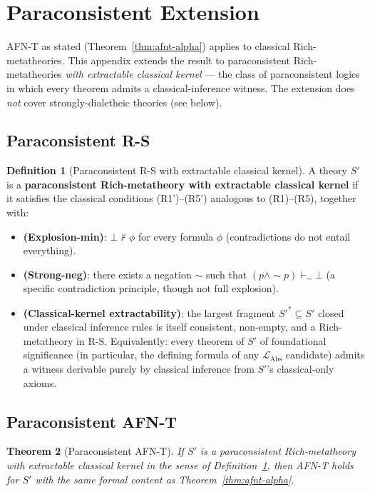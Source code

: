 \documentclass[11pt]{article}
\theoremstyle{plain}
\newtheorem{theorem}{Theorem}[section]
\theoremstyle{definition}
\newtheorem{definition}[theorem]{Definition}
\newcommand{\RS}{\mathrm{R\text{-}S}}
\newcommand{\LAbs}{\mathcal{L}_{\mathrm{Abs}}}
\begin{document}
\section{Paraconsistent Extension}\label{app:paraconsistent}

AFN-T as stated (Theorem~\ref{thm:afnt-alpha}) applies to classical Rich-metatheories. This appendix extends the result to paraconsistent Rich-metatheories \emph{with extractable classical kernel} --- the class of paraconsistent logics in which every theorem admits a classical-inference witness. The extension does \emph{not} cover strongly-dialetheic theories (see below).

\subsection{Paraconsistent R-S}

\begin{definition}[Paraconsistent R-S with extractable classical kernel]\label{def:paraconsistent-rs}
A theory $S'$ is a \textbf{paraconsistent Rich-metatheory with extractable classical kernel} if it satisfies the classical conditions (R1')--(R5') analogous to (R1)--(R5), together with:
\begin{itemize}
\item \textbf{(Explosion-min)}: $\bot \not\vdash \phi$ for every formula $\phi$ (contradictions do not entail everything).
\item \textbf{(Strong-neg)}: there exists a negation $\sim$ such that $(p \wedge \sim p) \vdash_\sim \bot$ (a specific contradiction principle, though not full explosion).
\item \textbf{(Classical-kernel extractability)}: the largest fragment $S'^* \subseteq S'$ closed under classical inference rules is itself consistent, non-empty, and a Rich-metatheory in $\RS$. Equivalently: every theorem of $S'$ of foundational significance (in particular, the defining formula of any $\LAbs$ candidate) admits a witness derivable purely by classical inference from $S'$'s classical-only axioms.
\end{itemize}
\end{definition}

\subsection{Paraconsistent AFN-T}

\begin{theorem}[Paraconsistent AFN-T]\label{thm:paraconsistent-afnt}
If $S'$ is a paraconsistent Rich-metatheory with extractable classical kernel in the sense of Definition~\ref{def:paraconsistent-rs}, then AFN-T holds for $S'$ with the same formal content as Theorem~\ref{thm:afnt-alpha}.
\end{theorem}
\end{document}
